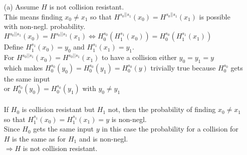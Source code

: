 \begin{itemize}
\item[(a)]
	Assume \(H\) is not collision resistant. \\
	This means finding \(x_0 \neq x_1\) so that \(H^{s_0 \vert\vert s_1}(x_0) = H^{s_0 \vert\vert s_1}(x_1)\) is possible with non-negl. probability. \\
	\(H^{s_0 \vert\vert s_1}(x_0) = H^{s_0 \vert\vert s_1}(x_1) \Leftrightarrow H^{s_0}_0(H^{s_1}_1(x_0)) = H^{s_0}_0(H^{s_1}_1(x_1)) \) \\
	Define \(H^{s_1}_1(x_0) = y_0\) and \(H^{s_1}_1(x_1) = y_1\). \\
	For \(H^{s_0 \vert\vert s_1}(x_0) = H^{s_0 \vert\vert s_1}(x_1)\) to have a collision either \(y_0 = y_1 = y\) \\
	which makes  \(H^{s_0}_0(y_0) = H^{s_0}_0(y_1) = H^{s_0}_0(y)\) trivially true because \(H^{s_0}_0\) gets the same input \\
	or \(H^{s_0}_0(y_0) = H^{s_0}_0(y_1)\) with \(y_0 \neq y_1\) \\
	\\
	If \(H_0\) is collision resistant but \(H_1\) not, then the probability of finding \(x_0 \neq x_1\) so that \(H^{s_1}_1(x_0) = H^{s_1}_1(x_1) = y\) is non-negl. \\
	Since \(H_0\) gets the same input \(y\) in this case the probability for a collision for \(H\) is the same as for \(H_1\) and is non-negl.\\
	\(\Rightarrow H\) is not collision resistant.\\


\end{itemize}
